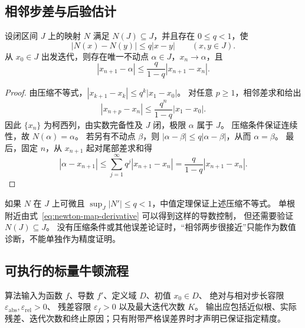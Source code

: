 \documentclass{ctexart}
\begin{document}
\subsection{相邻步差与后验估计}

\begin{proposition}[压缩条件下的步差估计]\label{prop:newton-step}
设闭区间 $J$ 上的映射 $N$ 满足 $N(J)\subseteq J$，并且存在 $0\le q<1$，使
\[
  |N(x)-N(y)|\le q|x-y|\qquad(x,y\in J).
\]
从 $x_0\in J$ 出发迭代，则存在唯一不动点 $\alpha\in J$，$x_n\to\alpha$，且
\begin{equation}\label{eq:newton-step-bound}
  |x_{n+1}-\alpha|\le\frac{q}{1-q}|x_{n+1}-x_n|.
\end{equation}
\end{proposition}

\begin{proof}
由压缩不等式，$|x_{k+1}-x_k|\le q^k|x_1-x_0|$。
对任意 $p\ge1$，相邻差求和给出
\[
  |x_{n+p}-x_n|\le\frac{q^n}{1-q}|x_1-x_0|.
\]
因此 $\{x_n\}$ 为柯西列，由实数完备性及 $J$ 闭，极限 $\alpha$ 属于 $J$。
压缩条件保证连续性，故 $N(\alpha)=\alpha$。
若另有不动点 $\beta$，则 $|\alpha-\beta|\le q|\alpha-\beta|$，从而 $\alpha=\beta$。
最后，固定 $n$，从 $x_{n+1}$ 起对尾部差求和得
\[
  |\alpha-x_{n+1}|\le\sum_{j=1}^{\infty}q^j|x_{n+1}-x_n|
  =\frac{q}{1-q}|x_{n+1}-x_n|.
\]
\end{proof}

如果 $N$ 在 $J$ 上可微且 $\sup_J|N'|\le q<1$，中值定理保证上述压缩不等式。
单根附近由式~\eqref{eq:newton-map-derivative} 可以得到这样的导数控制，
但还需要验证 $N(J)\subseteq J$。
没有压缩条件或其他误差论证时，“相邻两步很接近”只能作为数值诊断，不能单独作为精度证明。

\subsection{可执行的标量牛顿流程}

算法输入为函数 $f$、导数 $f'$、定义域 $D$、初值 $x_0\in D$、
绝对与相对步长容限 $\varepsilon_{\mathrm{abs}},\varepsilon_{\mathrm{rel}}>0$、
残差容限 $\varepsilon_f>0$ 以及最大迭代次数 $K$。
输出应包括近似根、实际残差、迭代次数和终止原因；只有附带严格误差界时才声明已保证指定精度。
\end{document}
